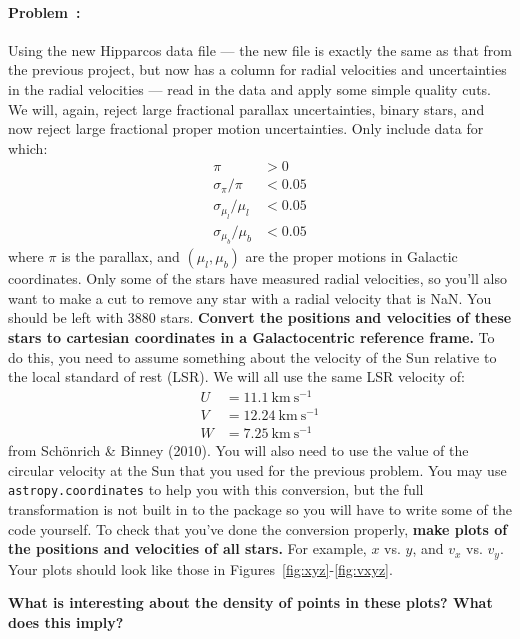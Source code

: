 \documentclass[12pt,twoside]{article}
\newcommand{\kms}{\mathrm{km}~\mathrm{s}^{-1}}
\newcommand{\problemname}{Problem}
\newcounter{problem}
\newenvironment{problem}{\paragraph{\problemname~\theproblem:}\refstepcounter{problem}}{}
\begin{document}
\begin{problem}
Using the new Hipparcos data file --- the new file is exactly the same as that from the previous project, but now has a column for radial velocities and uncertainties in the radial velocities --- read in the data and apply some simple quality cuts. We will, again, reject large fractional parallax uncertainties, binary stars, and now reject large fractional proper motion uncertainties. Only include data for which:
\begin{align}
 \pi &> 0\\
\sigma_\pi / \pi &< 0.05\\
\sigma_{\mu_l} / \mu_l &< 0.05\\
\sigma_{\mu_b} / \mu_b &< 0.05
\end{align}
where $\pi$ is the parallax, and $(\mu_l,\mu_b)$ are the proper motions in Galactic coordinates. Only some of the stars have measured radial velocities, so you'll also want to make a cut to remove any star with a radial velocity that is NaN. You should be left with 3880 stars. {\bf Convert the positions and velocities of these stars to cartesian coordinates in a Galactocentric reference frame.} To do this, you need to assume something about the velocity of the Sun relative to the local standard of rest (LSR). We will all use the same LSR velocity of:
\begin{align}
U &= 11.1~\kms\\
V &= 12.24~\kms\\
W &= 7.25~\kms
\end{align}
from Sch\"onrich \& Binney (2010). You will also need to use the value of the circular velocity at the Sun that you used for the previous problem. You may use \texttt{astropy.coordinates} to help you with this conversion, but the full transformation is not built in to the package so you will have to write some of the code yourself. To check that you've done the conversion properly, {\bf make plots of the positions and velocities of all stars.} For example, $x$ vs. $y$, and $v_x$ vs. $v_y$. Your plots should look like those in Figures~\ref{fig:xyz}-\ref{fig:vxyz}.

{\bf What is interesting about the density of points in these plots? What does this imply?}

\end{problem}
\end{document}
